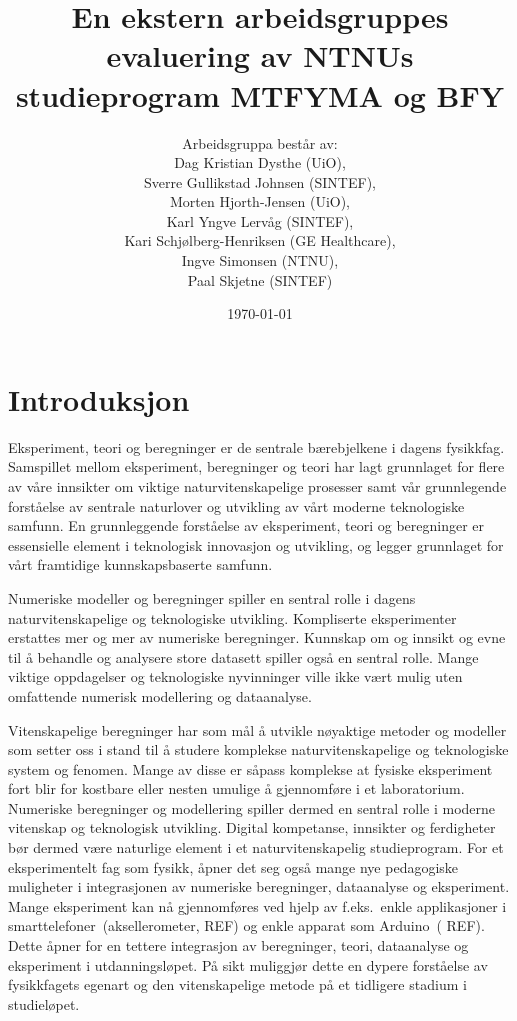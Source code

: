 \documentclass{article}
\title{En ekstern arbeidsgruppes evaluering av NTNUs studieprogram MTFYMA og BFY}
\author{Arbeidsgruppa består av: \\ Dag Kristian Dysthe (UiO), \\ Sverre Gullikstad Johnsen (SINTEF), \\ Morten Hjorth-Jensen (UiO), \\ Karl Yngve Lervåg (SINTEF), \\ Kari Schjølberg-Henriksen (GE Healthcare), \\ Ingve Simonsen (NTNU), \\ Paal Skjetne (SINTEF)}
\date{\today}
\begin{document}
\maketitle
\tableofcontents

\section{Introduksjon}
Eksperiment, teori og beregninger er de sentrale bærebjelkene i dagens fysikkfag. Samspillet mellom  eksperiment, beregninger og teori har lagt grunnlaget for flere av våre innsikter om  viktige naturvitenskapelige prosesser  samt vår grunnlegende forståelse av sentrale naturlover og utvikling av vårt moderne teknologiske samfunn.
En grunnleggende forståelse av eksperiment, teori og beregninger er essensielle element i teknologisk innovasjon og utvikling, og legger grunnlaget for vårt framtidige kunnskapsbaserte samfunn. 

Numeriske modeller og beregninger spiller en sentral rolle i dagens naturvitenskapelige og teknologiske utvikling. Kompliserte eksperimenter erstattes mer og mer av numeriske beregninger. Kunnskap om og innsikt og evne til å behandle og analysere store datasett spiller også en sentral rolle. Mange viktige oppdagelser og teknologiske nyvinninger ville ikke vært mulig uten omfattende numerisk modellering og dataanalyse.  

Vitenskapelige beregninger har som mål å utvikle nøyaktige metoder og modeller som setter oss i stand til å studere komplekse naturvitenskapelige og teknologiske system og fenomen. Mange av disse er såpass komplekse at fysiske eksperiment fort blir for kostbare eller nesten umulige å gjennomføre i et laboratorium. Numeriske beregninger og modellering spiller dermed en sentral rolle i moderne vitenskap og teknologisk utvikling. 
Digital kompetanse, innsikter og ferdigheter bør dermed være naturlige element i et naturvitenskapelig studieprogram. For et eksperimentelt fag som fysikk, åpner det seg også mange nye pedagogiske muligheter i integrasjonen av numeriske beregninger, dataanalyse og eksperiment. Mange eksperiment kan nå gjennomføres ved hjelp av f.eks.\ enkle applikasjoner i smarttelefoner~(aksellerometer, {\color{red} REF}) og enkle apparat som Arduino~({\color{red} REF}). Dette åpner for en tettere integrasjon av beregninger, teori, dataanalyse og eksperiment i utdanningsløpet. På sikt muliggjør dette en dypere forståelse av fysikkfagets egenart og den vitenskapelige metode på et tidligere stadium i studieløpet.
\end{document}
